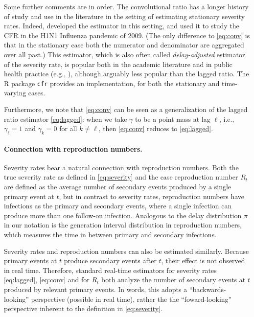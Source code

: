 \documentclass{article}
\begin{document}
Some further comments are in order. The convolutional ratio has a longer history
of study and use in the literature in the setting of estimating stationary
severity rates. Indeed, \citet{nishiura} developed the estimator in this setting,
and used it to study the CFR in the H1N1 Influenza pandemic of 2009. (The only
difference to \eqref{eq:conv} is that in the stationary case both the numerator
and denominator are aggregated over all past.) This estimator, which is also
often called \emph{delay-adjusted} estimator of the severity rate, is popular
both in the academic literature and in public health practice (e.g.,
\citealp{nishiuraEx1, nishiuraEx2, Russell2020, Unnikrishnan2021}), although 
arguably less popular than the lagged ratio. The R package \texttt{cfr}
\citep{cfr_package} provides an implementation, for   
both the stationary and time-varying cases. 

Furthermore, we note that \eqref{eq:conv} can be seen as a generalization of the  
lagged ratio estimator \eqref{eq:lagged}: when we take $\gamma$ to be a point
mass at lag $\ell$, i.e., $\gamma_\ell = 1$ and $\gamma_k = 0$ for all $k \not=
\ell$, then \eqref{eq:conv} reduces to \eqref{eq:lagged}.   

\paragraph{Connection with reproduction numbers.} 

Severity rates bear a natural connection with reproduction numbers. Both the
true severity rate as defined in \eqref{eq:severity} and the case reproduction
number $R_t$ are defined as the average number of secondary events produced by a
single primary event at $t$, but in contrast to severity rates, reproduction
numbers have infections as the primary and secondary events, where a single
infection can produce more than one follow-on infection. Analogous to the delay
distribution $\pi$ in our notation is the generation interval distribution in
reproduction numbers, which measures the time in between primary and secondary
infections. 

Severity rates and reproduction numbers can also be estimated similarly. Because
primary events at $t$ produce secondary events after $t$, their effect is not
observed in real time. Therefore, standard real-time estimators for severity
rates \eqref{eq:lagged}, \eqref{eq:conv} and for $R_t$ both analyze the number
of  secondary events at $t$ produced by relevant primary events. In words, this 
adopts a ``backwards-looking'' perspective (possible in real time), rather the 
the ``foward-looking'' perspective inherent to the definition in
\eqref{eq:severity}. 
\end{document}
